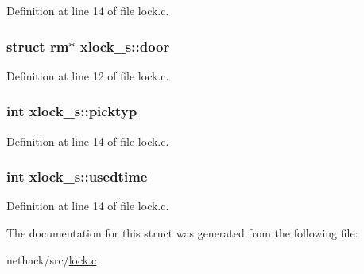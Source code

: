 Definition at line 14 of file lock.\+c.

\hypertarget{structxlock__s_a4e74d1288459a9d475d99f3b729a5276}{
\subsubsection[{door}]{\setlength{\rightskip}{0pt plus 5cm}struct {\bf rm}$\ast$ xlock\+\_\+s\+::door}}\label{structxlock__s_a4e74d1288459a9d475d99f3b729a5276}


Definition at line 12 of file lock.\+c.

\hypertarget{structxlock__s_a0e6243e3d63517ca861316763f417efd}{
\subsubsection[{picktyp}]{\setlength{\rightskip}{0pt plus 5cm}int xlock\+\_\+s\+::picktyp}}\label{structxlock__s_a0e6243e3d63517ca861316763f417efd}


Definition at line 14 of file lock.\+c.

\hypertarget{structxlock__s_a1437d19db36015e78beb456cf7cba2bb}{
\subsubsection[{usedtime}]{\setlength{\rightskip}{0pt plus 5cm}int xlock\+\_\+s\+::usedtime}}\label{structxlock__s_a1437d19db36015e78beb456cf7cba2bb}


Definition at line 14 of file lock.\+c.



The documentation for this struct was generated from the following file\+:\begin{DoxyCompactItemize}
\item 
nethack/src/\hyperlink{lock_8c}{lock.\+c}\end{DoxyCompactItemize}
